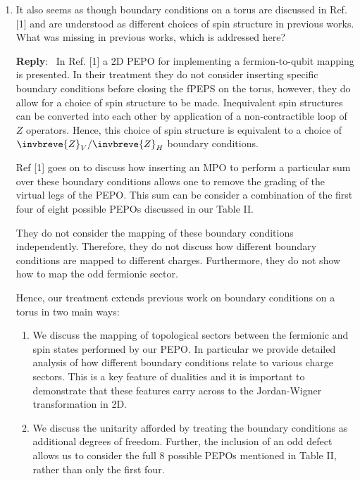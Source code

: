 \documentclass[aps,prx,floatfix,10pt,amssymb,amsfont,amsmath,superscriptaddress,float,nofootinbib,longbibliography,nobalancelastpage]{revtex4-2}
\newenvironment{reply}
   {\medskip \noindent \begin{sf}\textbf{Reply}:\ \color{blue}  }
   {\medskip \end{sf}}
\begin{document}
\begin{enumerate}
\begin{reply}
    Aside from these novel features of our discussion, we included our discussion of 1D PEPO boundary conditions to help the reader understand our methodology before we then extend into 2D. There exist other methods for analysing the 1D boundary conditions such as first bosonising the virtual legs, however these do not easily generalise to higher dimensions. 
\end{reply}

\item It also seems as though boundary conditions on a torus are discussed in Ref. [1] and are understood as different choices of spin structure in previous works. What was missing in previous works, which is addressed here?

    \begin{reply}
        In Ref. [1] a 2D PEPO for implementing a fermion-to-qubit mapping is presented. In their treatment they do not consider inserting specific boundary conditions before closing the fPEPS on the torus, however, they do allow for a choice of spin structure to be made. Inequivalent spin structures can be converted into each other by application of a non-contractible loop of $Z$ operators. Hence, this choice of spin structure is equivalent to a choice of $\invbreve{Z}_V/\invbreve{Z}_H$ boundary conditions. 
        
        Ref [1] goes on to discuss how inserting an MPO to perform a particular sum over these boundary conditions allows one to remove the grading of the virtual legs of the PEPO. This sum can be consider a combination of the first four of eight possible PEPOs discussed in our Table II.

        They do not consider the mapping of these boundary conditions independently. Therefore, they do not discuss how different boundary conditions are mapped to different charges. Furthermore, they do not show how to map the odd fermionic sector.

        Hence, our treatment extends previous work on boundary conditions on a torus in two main ways:
        \begin{enumerate}
            \item We discuss the mapping of topological sectors between the fermionic and spin states performed by our PEPO. In particular we provide detailed analysis of how different boundary conditions relate to various charge sectors. This is a key feature of dualities and it is important to demonstrate that these features carry across to the Jordan-Wigner transformation in 2D.
            \item We discuss the unitarity afforded by treating the boundary conditions as additional degrees of freedom. Further, the inclusion of an odd defect allows us to consider the full 8 possible PEPOs mentioned in Table II, rather than only the first four. 
        \end{enumerate}
    \end{reply}
\end{enumerate}
\end{document}
